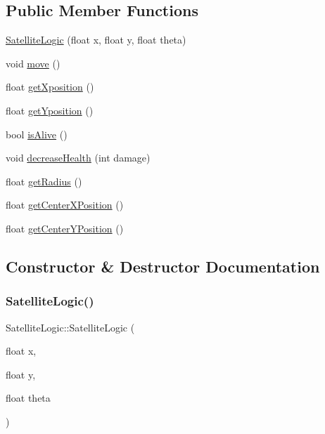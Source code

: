 \subsection*{Public Member Functions}
\begin{DoxyCompactItemize}
\item 
\hyperlink{class_satellite_logic_af35f51991748099bc492ed7ba82b3b75}{Satellite\+Logic} (float x, float y, float theta)
\item 
void \hyperlink{class_satellite_logic_a1ad746e5a17b9ac2bea379fca9a74147}{move} ()
\item 
float \hyperlink{class_satellite_logic_a3a35c4c5b5ff051dbfcffc7ce85e40a2}{get\+Xposition} ()
\item 
float \hyperlink{class_satellite_logic_a1b0cb67d5bdb3cb120ec12b2be65755c}{get\+Yposition} ()
\item 
bool \hyperlink{class_satellite_logic_aa8f39f77a7783f8a97698ea750b34e94}{is\+Alive} ()
\item 
void \hyperlink{class_satellite_logic_ab026cc80cbd0f9f1b6e4970f121c6b7f}{decrease\+Health} (int damage)
\item 
float \hyperlink{class_satellite_logic_a5b86efe041f1d537ec83b9f7dd574b7e}{get\+Radius} ()
\item 
float \hyperlink{class_satellite_logic_aa6e4c41fc34adaf4ef7861a6a3785226}{get\+Center\+X\+Position} ()
\item 
float \hyperlink{class_satellite_logic_a416fb2cabc7fcc003cbe04da68dac7c3}{get\+Center\+Y\+Position} ()
\end{DoxyCompactItemize}


\subsection{Constructor \& Destructor Documentation}
\mbox{\label{class_satellite_logic_af35f51991748099bc492ed7ba82b3b75}} 
\subsubsection{\texorpdfstring{Satellite\+Logic()}{SatelliteLogic()}}
{\footnotesize\ttfamily Satellite\+Logic\+::\+Satellite\+Logic (\begin{DoxyParamCaption}\item[{float}]{x,  }\item[{float}]{y,  }\item[{float}]{theta }\end{DoxyParamCaption})}



